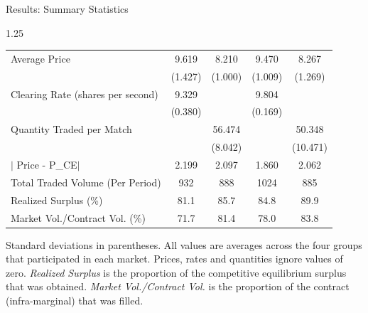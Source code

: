 \documentclass[10pt]{beamer}
\begin{document}
\begin{frame}{Results: Summary Statistics}
\begin{table}[H]
{\begin{threeparttable}
\begin{spacing}{1.25}
\begin{tabular}{lcccc}
                 Average Price                    & 9.619                 & 8.210                & 9.470                 & 8.267    \\
                                                  & (1.427)               & (1.000)              & (1.009)               & (1.269)  \\
                 Clearing Rate (shares per second)& 9.329                 & ~                    & 9.804                 & ~        \\
                                                  & (0.380)               & ~                    & (0.169)               & ~        \\
                 Quantity Traded per Match        & ~                     & 56.474               & ~                     & 50.348   \\
                                                  & ~                     & (8.042)              & ~                     & (10.471) \\
                 $\mid$ Price - P_{CE}$\mid$      & 2.199                 & 2.097                & 1.860                 & 2.062    \\
                 Total Traded Volume (Per Period) & 932                   & 888                  & 1024                  & 885      \\
                 Realized Surplus (\%)            & 81.1                  & 85.7                 & 84.8                  & 89.9     \\
                 Market Vol./Contract Vol. (\%)   & 71.7                  & 81.4                 & 78.0                  & 83.8     \\
                \hline
                \hline
            \end{tabular}
            \end{spacing}
            \begin{tablenotes}\noindent\justifying\scriptsize Standard deviations in parentheses. All values are averages across the four groups that participated in each market. Prices, rates and quantities ignore values of zero. \textit{Realized Surplus} is the proportion of the competitive equilibrium surplus that was obtained. \textit{Market Vol./Contract Vol.} is the proportion of the contract (infra-marginal) that was filled. \end{tablenotes}
        \end{threeparttable}}
    \end{table}
\end{frame}
\end{document}
